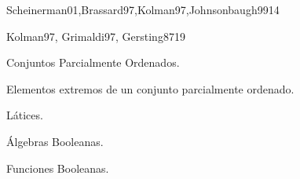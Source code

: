 \begin{syllabus}
\begin{unit}{\DSTHREEDef}{Scheinerman01,Brassard97,Kolman97,Johnsonbaugh99}{14}
\begin{topics}
      \item \DSTHREETopicNociones
      \item \DSTHREETopicEstructura
      \item \DSTHREETopicPruebas
      \item \DSTHREETopicPruebasy
      \item \DSTHREETopicPruebaspor
      \item \DSTHREETopicPruebasporcontradiccion
      \item \DSTHREETopicInduccion
      \item \DSTHREETopicInduccionfuerte
      \item \DSTHREETopicDefiniciones
      \item \DSTHREETopicEl
   \end{topics}

   \begin{unitgoals}
      \item \DSTHREEObjONE
      \item \DSTHREEObjTWO
      \item \DSTHREEObjTHREE
      \item \DSTHREEObjFOUR
   \end{unitgoals}
\end{unit}

\begin{unit}{\ARONEDef}{Kolman97, Grimaldi97, Gersting87}{19}
\begin{topics}
      \item Conjuntos Parcialmente Ordenados.
      \item Elementos extremos de un conjunto parcialmente ordenado.
      \item Látices.
      \item Álgebras Booleanas.
      \item Funciones Booleanas.
      \item \ARONETopicExpresiones
      \item \ARONETopicBloques
   \end{topics}
   \begin{unitgoals}
      \item \DSTHREEObjONE
      \item \DSTHREEObjTWO
      \item \DSTHREEObjTHREE
   \end{unitgoals}
\end{unit}


\end{syllabus}
